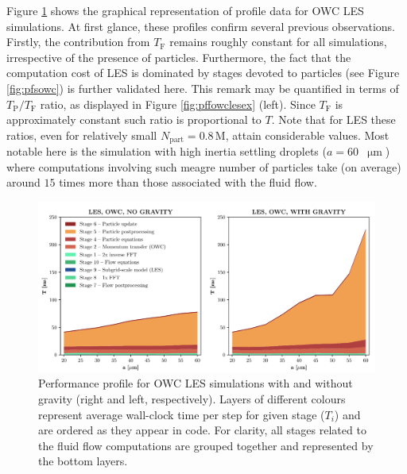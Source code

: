 \documentclass{pracamgren}
\begin{document}
\medskip

Figure \ref{fig:pffowcles} shows the graphical representation of profile data for OWC LES simulations.
At first glance, these profiles confirm several previous observations.
Firstly, the contribution from $T_\text{F}$ remains roughly constant for all simulations, irrespective of the presence of particles.
Furthermore, the fact that the computation cost of LES is dominated by stages devoted to particles (see Figure \ref{fig:pfsowc}) is further validated here.
This remark may be quantified in terms of $T_{\text{P}} / T_{\text{F}}$ ratio, as displayed in Figure \ref{fig:pffowclesex} (left).
Since $T_{\text{F}}$ is approximately constant such ratio is proportional to $T$.
Note that for LES these ratios, even for relatively small $N_{\text{part}} = 0.8 \, \text{M}$, attain considerable values.
Most notable here is the simulation with high inertia settling droplets ($a = 60$~$\upmu\text{m}$) where computations involving such meagre number of particles take (on average) around $15$ times more than those associated with the fluid flow.

\begin{figure}[h]
\centering
\includegraphics[width=13.5cm]{figures/3-06_pffowcles.pdf}
\caption{
Performance profile for OWC LES simulations with and without gravity (right and left, respectively).
Layers of different colours represent average wall-clock time per step for given stage ($T_i$) and are ordered as they appear in code.
For clarity, all stages related to the fluid flow computations are grouped together and represented by the bottom layers.
}
\label{fig:pffowcles}
\end{figure}
\end{document}
